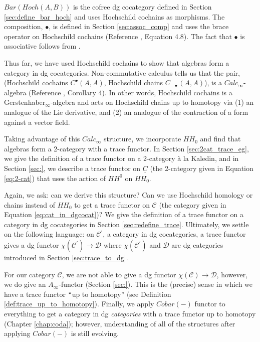 $Bar(Hoch(A,B))$ is the cofree dg cocategory defined in Section \ref{sec:define_bar_hoch} and uses Hochschild cochains as morphisms. The composition, $\bullet$, is defined in Section \ref{sec:assoc_comp} and uses the brace operator on Hochschild cochains (Reference \cite{T}, Equation 4.8). The fact that $\bullet$ is associative follows from \cite{(Getzler-Jones; Voronov-Gerstenhaber, Lyubashenko-Manzyuk; Keller)}. 

Thus far, we have used Hochschild cochains to show that algebras form a category in dg cocategories. Non-commutative calculus tells us that the pair, (Hochschild cochains $C^\bullet(A,A)$, Hochschild chains $C_{-\bullet}(A,A)$), is a $Calc_\infty$-algebra (Reference \cite{DTT}, Corollary 4). In other words, Hochschild cochains is a Gerstenhaber$_\infty$-algebra and acts on Hochschild chains up to homotopy via (1) an analogue of the Lie derivative, and (2) an analogue of the contraction of a form against a vector field.

Taking advantage of this $Calc_\infty$ structure, we incorporate $HH_0$ and find that algebras form a 2-category with a trace functor. In Section \ref{sec:2cat_trace_eg}, we give the definition of a trace functor on a 2-category \`{a} la Kaledin, and in Section \ref{sec:}, we describe a trace functor on $\underline{C}$ (the 2-category given in Equation \ref{eq:2-cat}) that uses the action of $HH^0$ on $HH_0$.

Again, we ask: can we derive this structure? Can we use Hochschild homology or chains instead of $HH_0$ to get a trace functor on $\mathcal{C}$ (the category given in Equation \ref{eq:cat_in_dgcocat})? We give the definition of a trace functor on a category in dg cocategories in Section \ref{sec:redefine_trace}. Ultimately, we settle on the following language: on $\mathcal{C}^\prime$, a category in dg cocategories, a trace functor gives a dg functor $\chi(\mathcal{C}^\prime) \to \mathcal{D}$ where $\chi(\mathcal{C}^\prime)$ and $\mathcal{D}$ are dg categories introduced in Section \ref{sec:trace_to_dg}. 

For our category $\mathcal{C}$, we are not able to give a dg functor $\chi(\mathcal{C}) \to \mathcal{D}$, however, we do give an $A_\infty$-functor (Section \ref{sec:}). This is the (precise) sense in which we have a trace functor $``$up to homotopy'' (see Definition \ref{def:trace_up_to_homotopy}). Finally, we apply $Cobar(-)$ functor to everything to get a category in dg \textit{categories} with a trace functor up to homotopy (Chapter \ref{chap:coda}); however, understanding of all of the structures after applying $Cobar(-)$ is still evolving.


